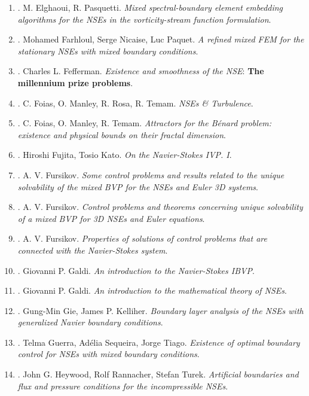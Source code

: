 \documentclass{article}
\begin{document}
\begin{enumerate}
	\item \cite{Elghaoui_Pasquetti1999}. {\sc M.  Elghaoui, R. Pasquetti}. {\it Mixed spectral-boundary element embedding algorithms for the NSEs in the vorticity-stream function formulation}.
	\item \cite{Farhloul_Nicaise_Paquet2008}. {\sc Mohamed Farhloul, Serge Nicaise, Luc Paquet}. {\it A refined mixed FEM for the stationary NSEs with mixed boundary conditions}.
	\item \cite{Fefferman2006}. {\sc Charles L. Fefferman}. {\it Existence and smoothness of the NSE}: {\bf The millennium prize problems}.
	\item \cite{Foias_Manley_Rosa_Temam2001}. {\sc C. Foias, O. Manley, R. Rosa, R. Temam}. {\it NSEs \& Turbulence}.
	\item \cite{Foias_Manley_Temam1987}. {\sc C. Foias, O. Manley,  R. Temam}. {\it Attractors for the B\'{e}nard problem: existence and physical bounds on their fractal dimension}.
	\item \cite{Fujita_Kato1964}. {\sc Hiroshi Fujita, Tosio Kato}. {\it On the Navier-Stokes IVP. I}.
	\item \cite{Fursikov1980}. {\sc A. V. Fursikov}. {\it Some control problems and results related to the unique solvability of the mixed BVP for the NSEs and Euler 3D systems}.
	\item \cite{Fursikov1981}. {\sc A. V. Fursikov}. {\it Control problems and theorems concerning unique solvability of a mixed BVP for 3D NSEs and Euler equations}.
	\item \cite{Fursikov1982}. {\sc A. V. Fursikov}. {\it Properties of solutions of control problems that are connected with the Navier-Stokes system}.
	\item \cite{Galdi2000}. {\sc Giovanni P. Galdi}. {\it An introduction to the Navier-Stokes IBVP}.
	\item \cite{Galdi2011}. {\sc Giovanni P. Galdi}. {\it An introduction to the mathematical theory of NSEs}.
	\item \cite{Gie_Kelliher2012}. {\sc Gung-Min Gie, James P. Kelliher}. {\it Boundary layer analysis of the NSEs with generalized Navier boundary conditions}.
	\item \cite{Guerra_Sequeira2015}. {\sc Telma Guerra,  Ad\'{e}lia Sequeira, Jorge Tiago}. {\it Existence of optimal boundary control for NSEs with mixed boundary conditions}.
	\item \cite{Heywood_Rannacher_Turek1996}. {\sc John G. Heywood, Rolf Rannacher, Stefan Turek}. {\it Artificial boundaries and flux and pressure conditions for the incompressible NSEs}.

\end{enumerate}
\end{document}
